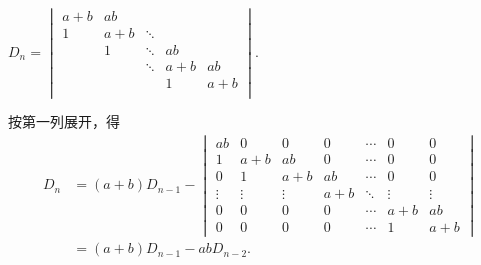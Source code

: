 \begin{exercise}
\begin{exgroup}
        \item $D_n=\begin{vmatrix}
                a+b & ab  &        &     &     \\
                1   & a+b & \ddots &     &     \\
                    & 1   & \ddots & ab  &     \\
                    &     & \ddots & a+b & ab  \\
                    &     &        & 1   & a+b \\
            \end{vmatrix}$.
        \begin{answer}
            按第一列展开，得
            \begin{align*}
                D_{n} & =(a+b) D_{n-1}-\begin{vmatrix}
                                            a b    & 0      & 0      & 0   & \cdots & 0      & 0      \\
                                            1      & a+b    & a b    & 0   & \cdots & 0      & 0      \\
                                            0      & 1      & a+b    & a b & \cdots & 0      & 0      \\
                                            \vdots & \vdots & \vdots & a+b & \ddots & \vdots & \vdots \\
                                            0      & 0      & 0      & 0   & \cdots & a+b    & a b    \\
                                            0      & 0      & 0      & 0   & \cdots & 1      & a+b
                                        \end{vmatrix} \\
                        & =(a+b) D_{n-1}-a b D_{n-2}.
            \end{align*}
\end{answer}
\end{exgroup}
\end{exercise}
